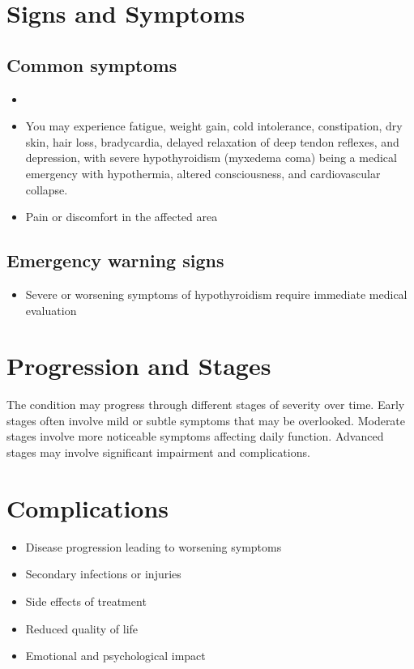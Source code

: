 \section{Signs and Symptoms}

\subsection{Common symptoms}
\begin{itemize}[noitemsep]
  \item \item You may experience fatigue, weight gain, cold intolerance, constipation, dry skin, hair loss, bradycardia, delayed relaxation of deep tendon reflexes, and depression, with severe hypothyroidism (myxedema coma) being a medical emergency with hypothermia, altered consciousness, and cardiovascular collapse.

  \item Pain or discomfort in the affected area
  \end{itemize}

\subsection{Emergency warning signs}
\begin{itemize}[noitemsep]
  \item Severe or worsening symptoms of hypothyroidism require immediate medical evaluation
\end{itemize}
\section{Progression and Stages}
The condition may progress through different stages of severity over time. Early stages often involve mild or subtle symptoms that may be overlooked. Moderate stages involve more noticeable symptoms affecting daily function. Advanced stages may involve significant impairment and complications.
\section{Complications}
\begin{itemize}[noitemsep]
  \item Disease progression leading to worsening symptoms
  \item Secondary infections or injuries
  \item Side effects of treatment
  \item Reduced quality of life
  \item Emotional and psychological impact
\end{itemize}
